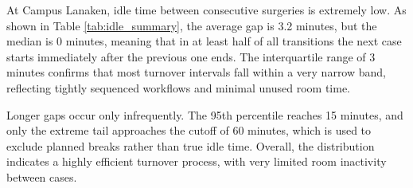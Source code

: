\documentclass[
]{article}
\begin{document}
At Campus Lanaken, idle time between consecutive surgeries is extremely
low. As shown in Table \ref{tab:idle_summary}, the average gap is 3.2
minutes, but the median is 0 minutes, meaning that in at least half of
all transitions the next case starts immediately after the previous one
ends. The interquartile range of 3 minutes confirms that most turnover
intervals fall within a very narrow band, reflecting tightly sequenced
workflows and minimal unused room time.

Longer gaps occur only infrequently. The 95th percentile reaches 15
minutes, and only the extreme tail approaches the cutoff of 60 minutes,
which is used to exclude planned breaks rather than true idle time.
Overall, the distribution indicates a highly efficient turnover process,
with very limited room inactivity between cases.
\end{document}
